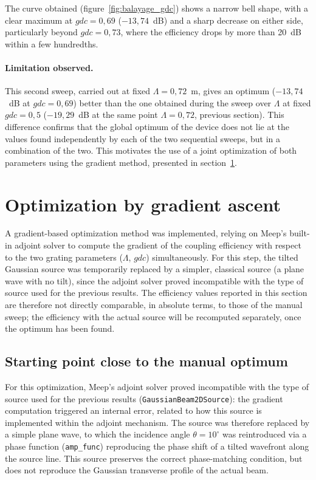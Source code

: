 \documentclass[a4paper,11pt]{report}
\begin{document}
The curve obtained (figure~\ref{fig:balayage_gdc}) shows a narrow bell shape, with a clear maximum at $gdc=0{,}69$ ($-13{,}74$~dB) and a sharp decrease on either side, particularly beyond $gdc=0{,}73$, where the efficiency drops by more than 20~dB within a few hundredths.

\paragraph{Limitation observed.} This second sweep, carried out at fixed $\Lambda=0{,}72$~\textmu m, gives an optimum ($-13{,}74$~dB at $gdc=0{,}69$) better than the one obtained during the sweep over $\Lambda$ at fixed $gdc=0{,}5$ ($-19{,}29$~dB at the same point $\Lambda=0{,}72$, previous section). This difference confirms that the global optimum of the device does not lie at the values found independently by each of the two sequential sweeps, but in a combination of the two. This motivates the use of a joint optimization of both parameters using the gradient method, presented in section~\ref{sec:adjoint}.


\section{Optimization by gradient ascent}
\label{sec:adjoint}

A gradient-based optimization method was implemented, relying on Meep's built-in adjoint solver to compute the gradient of the coupling efficiency with respect to the two grating parameters ($\Lambda$, $gdc$) simultaneously. For this step, the tilted Gaussian source was temporarily replaced by a simpler, classical source (a plane wave with no tilt), since the adjoint solver proved incompatible with the type of source used for the previous results. The efficiency values reported in this section are therefore not directly comparable, in absolute terms, to those of the manual sweep; the efficiency with the actual source will be recomputed separately, once the optimum has been found.

\subsection*{Starting point close to the manual optimum}

For this optimization, Meep's adjoint solver proved incompatible with the type of source used for the previous results (\texttt{GaussianBeam2DSource}): the gradient computation triggered an internal error, related to how this source is implemented within the adjoint mechanism. The source was therefore replaced by a simple plane wave, to which the incidence angle $\theta=10^\circ$ was reintroduced via a phase function (\texttt{amp\_func}) reproducing the phase shift of a tilted wavefront along the source line. This source preserves the correct phase-matching condition, but does not reproduce the Gaussian transverse profile of the actual beam. 
\end{document}
